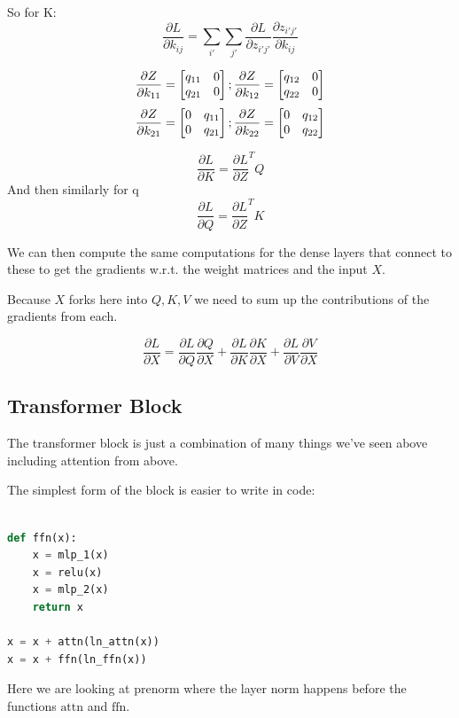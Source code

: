 \documentclass{article}
\begin{document}
So for K:
$$
\frac{\partial L}{\partial k_{ij}} = 
\sum_{i'}\sum_{j'}\frac{\partial L}{\partial z_{i'j'}}
\frac{\partial z_{i'j'}}{\partial k_{ij}}
$$

$$
\frac{\partial Z}{\partial k_{11}} = \begin{bmatrix}
   q_{11} & 0 \\ q_{21} & 0
\end{bmatrix}; \space 
\frac{\partial Z}{\partial k_{12}} = \begin{bmatrix}
    q_{12} & 0 \\ q_{22} & 0
\end{bmatrix}
$$
$$
\frac{\partial Z}{\partial k_{21}} = \begin{bmatrix}
    0 & q_{11} \\ 0 & q_{21}
\end{bmatrix}; \space 
\frac{\partial Z}{\partial k_{22}} = \begin{bmatrix}
    0 & q_{12} \\ 0 & q_{22}
\end{bmatrix}
$$

$$
\frac{\partial L}{\partial K} = \frac{\partial L}{\partial Z}^TQ
$$
And then similarly for q
$$
\frac{\partial L}{\partial Q} = \frac{\partial L}{\partial Z}^TK
$$

We can then compute the same computations for the dense layers that
connect to these to get the gradients w.r.t. the weight matrices and the
input $X$.

Because $X$ forks here into $Q, K, V$ we need to sum up the contributions
of the gradients from each.

$$
\frac{\partial L}{\partial X} = 
\frac{\partial L}{\partial Q}\frac{\partial Q}{\partial X} +
\frac{\partial L}{\partial K}\frac{\partial K}{\partial X} +
\frac{\partial L}{\partial V}\frac{\partial V}{\partial X}
$$

\subsection*{Transformer Block}

The transformer block is just a combination of many things
we've seen above including attention from above.

The simplest form of the block is easier to write in code:

\begin{lstlisting}[language=Python]

def ffn(x):
    x = mlp_1(x)
    x = relu(x)
    x = mlp_2(x)
    return x

x = x + attn(ln_attn(x))
x = x + ffn(ln_ffn(x))
\end{lstlisting}
Here we are looking at prenorm where the layer norm happens before the
functions $\text{attn}$ and $\text{ffn}$.
\end{document}
